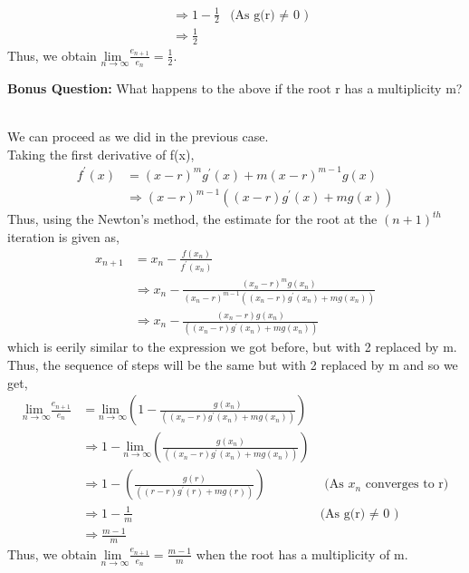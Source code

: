 \documentclass[letterpaper]{exam}
\begin{document}
\begin{questions}
\begin{solution}
\begin{align*}
    &\Rightarrow 
    1 - \frac{1}{2} &\mbox{(As g(r) $\neq$ 0 )}\\
    &\Rightarrow 
    \frac{1}{2}
\end{align*}
Thus, we obtain $\underset{n \rightarrow \infty}{\text{lim } } \frac{e_{n+1}}{e_{n}} = \frac{1}{2}$.
\end{solution}
\question [4] \textbf{Bonus Question:} What happens to the above if the root r has a multiplicity m?
\begin{solution}
\\
We can proceed as we did in the previous case.\\
Taking the first derivative of f(x),
\begin{align*}
    f^{'} (x) &= (x-r)^mg^{'}(x) + m(x-r)^{m-1}g(x)\\
    &\Rightarrow 
    (x-r)^{m-1}\left((x-r)g^{'}(x) + mg(x)\right)
\end{align*}
Thus, using the Newton's method, the estimate for the root at the $(n+1)^{th}$ iteration is given as,
\begin{align*}
    x_{n+1} &= x_{n} - \frac{f(x_n)}{f^{'}(x_n)}\\
    &\Rightarrow
    x_n - \frac{(x_n − r)^mg(x_n)}{(x_n-r)^{m-1}\left((x_n-r)g^{'}(x_n) + mg(x_n)\right)}\\
    &\Rightarrow
    x_n - \frac{(x_n − r)g(x_n)}{\left((x_n-r)g^{'}(x_n) + mg(x_n)\right)}
\end{align*}
which is eerily similar to the expression we got before, but with 2 replaced by m.\\
Thus, the sequence of steps will be the same but with 2 replaced by m and so we get,
\begin{align*}
  \underset{n \rightarrow \infty}{\text{lim } } \frac{e_{n+1}}{e_{n}} &=  \underset{n \rightarrow \infty}{\text{lim } } \left(1 - \frac{g(x_n)}{\left((x_n-r)g^{'}(x_n) + mg(x_n)\right)} \right)\\
    &\Rightarrow
    1 - \underset{n \rightarrow \infty}{\text{lim } } \left( \frac{g(x_n)}{\left((x_n-r)g^{'}(x_n) + mg(x_n)\right)} \right)\\
    &\Rightarrow
    1 - \left( \frac{g(r)}{\left((r-r)g^{'}(r) + mg(r)\right)} \right) &\mbox{ (As $x_n$ converges to r)}\\
    &\Rightarrow 
    1 - \frac{1}{m} &\mbox{(As g(r) $\neq$ 0 )}\\
    &\Rightarrow 
    \frac{m-1}{m}  
\end{align*}
Thus, we obtain $\underset{n \rightarrow \infty}{\text{lim } } \frac{e_{n+1}}{e_{n}} =  \frac{m-1}{m}$ when the root has a multiplicity of m.

\end{solution}
\end{questions}
\end{document}
